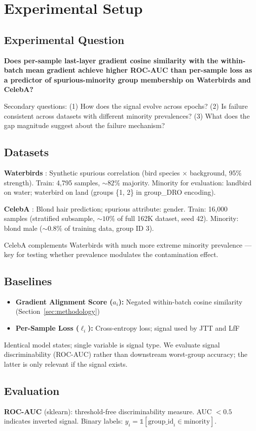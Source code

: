 \section{Experimental Setup}
\label{sec:experiments}

\subsection{Experimental Question}

\textbf{Does per-sample last-layer gradient cosine similarity with the within-batch mean gradient achieve higher ROC-AUC than per-sample loss as a predictor of spurious-minority group membership on Waterbirds and CelebA?}

Secondary questions: (1) How does the signal evolve across epochs? (2) Is failure consistent across datasets with different minority prevalences? (3) What does the gap magnitude suggest about the failure mechanism?

\subsection{Datasets}

\textbf{Waterbirds} \citep{Wah2011Caltech,Sagawa2020Distributionally}: Synthetic spurious correlation (bird species $\times$ background, 95\% strength). Train: 4,795 samples, ${\sim}82\%$ majority. Minority for evaluation: landbird on water; waterbird on land (groups \{1, 2\} in group\_DRO encoding).

\textbf{CelebA} \citep{Liu2015Deep}: Blond hair prediction; spurious attribute: gender. Train: 16,000 samples (stratified subsample, ${\sim}10\%$ of full 162K dataset, seed 42). Minority: blond male (${\sim}0.8\%$ of training data, group ID 3).

CelebA complements Waterbirds with much more extreme minority prevalence --- key for testing whether prevalence modulates the contamination effect.

\subsection{Baselines}

\begin{itemize}
  \item \textbf{Gradient Alignment Score ($a_i$):} Negated within-batch cosine similarity (Section~\ref{sec:methodology})
  \item \textbf{Per-Sample Loss ($\ell_i$):} Cross-entropy loss; signal used by JTT and LfF
\end{itemize}

Identical model states; single variable is signal type.
We evaluate signal discriminability (ROC-AUC) rather than downstream worst-group accuracy; the latter is only relevant if the signal exists.

\subsection{Evaluation}

\textbf{ROC-AUC} (sklearn): threshold-free discriminability measure.
AUC $< 0.5$ indicates inverted signal.
Binary labels: $y_i = \mathbb{1}[\text{group\_id}_i \in \text{minority}]$.
